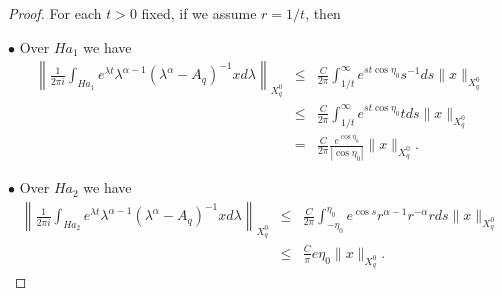 \documentclass[12pt,reqno]{amsart}
\begin{document}
\begin{proof}
				
				
				
	
	For each $t>0$ fixed, if we assume $r=1/t$, then 
	

		\noindent $\bullet$ Over $Ha_1$ we have
		\begin{eqnarray*}
			\left\|\frac{1}{2\pi i}\int_{Ha_1}e^{\lambda t}\lambda^{\alpha-1}(\lambda^{\alpha}-A_q)^{-1}xd\lambda\right\|_{X^{0}_{q}} %
			& \leq & \frac{C}{2\pi}\int_{1/t}^\infty e^{st\cos\eta_0}s^{-1}ds\|x\|_{X^{0}_{q}}\\
			& \leq & \frac{C}{2\pi}\int_{1/t}^\infty e^{st\cos\eta_0}tds\|x\|_{X^{0}_{q}}\\
			& = & \frac{C}{2\pi}\frac{e^{\cos\eta_0}}{|\cos\eta_0|}\|x\|_{X^{0}_{q}}.
		\end{eqnarray*}
		
		\noindent $\bullet$ Over $Ha_2$ we have
		\begin{eqnarray*}
			\left\|\frac{1}{2\pi i}\int_{Ha_2}e^{\lambda t}\lambda^{\alpha-1}(\lambda^{\alpha}-A_q)^{-1}xd\lambda\right\|_{X^{0}_{q}} %
			& \leq & \frac{C}{2\pi}\int_{-\eta_0}^{\eta_0} e^{\cos s}r^{\alpha-1} r^{-\alpha}rds\|x\|_{X^{0}_{q}}\\
			& \leq & \frac{C}{\pi}e\eta_0 \|x\|_{X^{0}_{q}}.
		\end{eqnarray*}
		

\end{proof}
\end{document}
